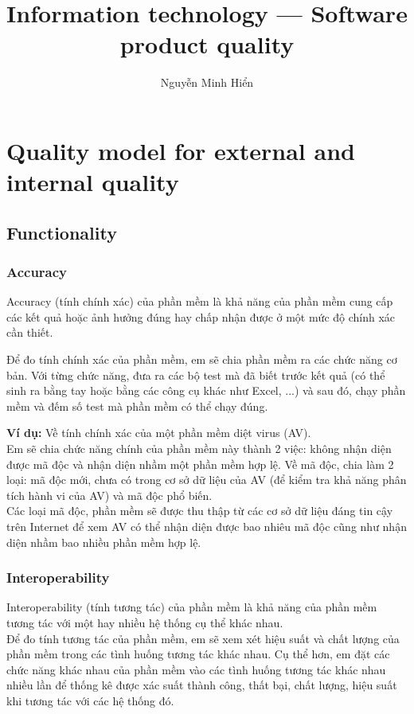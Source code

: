 \documentclass[14pt]{extarticle}
\title{Information technology — Software product quality}
\author{Nguyễn Minh Hiển}
\begin{document}
\newpage
\maketitle
\tableofcontents

\newpage
\setcounter{section}{5}
\section{Quality model for external and internal quality}

\subsection{Functionality}

\setcounter{subsubsection}{1}
\subsubsection{Accuracy}

Accuracy (tính chính xác) của phần mềm là khả năng của phần mềm cung cấp
các kết quả hoặc ảnh hưởng đúng hay chấp nhận được ở một mức độ
chính xác cần thiết.

Để đo tính chính xác của phần mềm, em sẽ chia phần mềm ra các
chức năng cơ bản. Với từng chức năng, đưa ra các bộ test mà
đã biết trước kết quả (có thể sinh ra bằng tay hoặc bằng các công
cụ khác như Excel, ...) và sau đó, chạy phần mềm và đếm số
test mà phần mềm có thể chạy đúng.

\textbf{Ví dụ:} Về tính chính xác của một phần mềm diệt virus (AV).\\
Em sẽ chia chức năng chính của phần mềm này thành 2 việc:
không nhận diện được mã độc và nhận diện nhầm một phần mềm hợp lệ.
Về mã độc, chia làm 2 loại: mã độc mới, chưa có trong cơ sở dữ liệu
của AV (để kiểm tra khả năng phân tích hành vi của AV) và mã độc
phổ biến.\\
Các loại mã độc, phần mềm sẽ được thu thập từ các cơ sở dữ liệu đáng tin cậy
trên Internet để xem AV có thể nhận diện được bao nhiêu mã độc cũng như
nhận diện nhầm bao nhiều phần mềm hợp lệ.

\subsubsection{Interoperability}
Interoperability (tính tương tác) của phần mềm là khả năng của phần mềm
tương tác với một hay nhiều hệ thống cụ thể khác nhau.\\
Để đo tính tương tác của phần mềm, em sẽ xem xét hiệu suất và chất lượng
của phần mềm trong các tình huống tương tác khác nhau. Cụ thể hơn, em đặt
các chức năng khác nhau của phần mềm vào các tình huống tương tác khác nhau
nhiều lần để thống kê được xác suất thành công, thất bại, chất lượng, hiệu suất
khi tương tác với các hệ thống đó.
\end{document}
